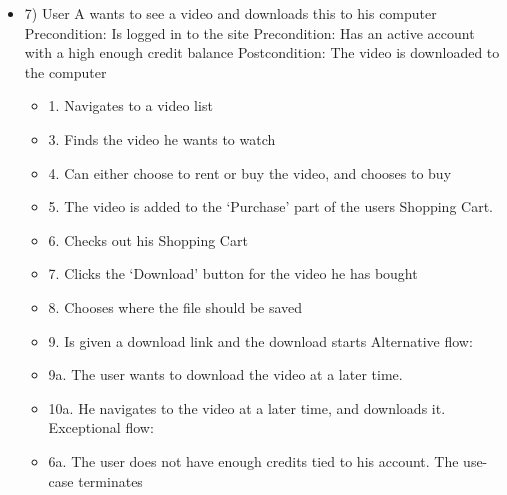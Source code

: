 \begin{itemize}
\item 7)
User A wants to see a video and downloads this to his computer
\newline Precondition: Is logged in to the site
\newline Precondition: Has an active account with a high enough credit balance
\newline Postcondition: The video is downloaded to the computer
\begin{itemize}
    \item 1. Navigates to a video list
    \item 3. Finds the video he wants to watch
    \item 4. Can either choose to rent or buy the video, and chooses to buy
    \item 5. The video is added to the ‘Purchase’ part of the users Shopping Cart.
    \item 6. Checks out his Shopping Cart
    \item 7. Clicks the ‘Download’ button for the video he has bought
    \item 8. Chooses where the file should be saved
    \item 9. Is given a download link and the download starts
\newline Alternative flow:
    \item 9a. The user wants to download the video at a later time.
    \item 10a. He navigates to the video at a later time, and downloads it.
\newline Exceptional flow:
    \item 6a. The user does not have enough credits tied to his account. The use-case terminates 
\end{itemize}


\end{itemize}
